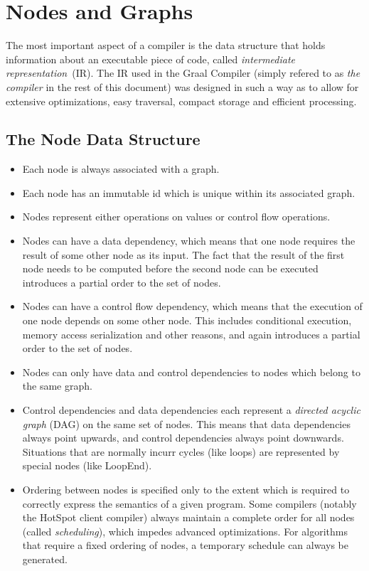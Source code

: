 \section{Nodes and Graphs}
The most important aspect of a compiler is the data structure that holds information about an executable piece of code, called \emph{intermediate representation}~(IR).
The IR used in the Graal Compiler (simply refered to as \emph{the compiler} in the rest of this document) was designed in such a way as to allow for extensive optimizations, easy traversal, compact storage and efficient processing.

\subsection{The Node Data Structure}
\begin{itemize}
    \item Each node is always associated with a graph.
    \item Each node has an immutable id which is unique within its associated graph.
    \item Nodes represent either operations on values or control flow operations.
    \item Nodes can have a data dependency, which means that one node requires the result of some other node as its input. The fact that the result of the first node needs to be computed before the second node can be executed introduces a partial order to the set of nodes.
    \item Nodes can have a control flow dependency, which means that the execution of one node depends on some other node. This includes conditional execution, memory access serialization and other reasons, and again introduces a partial order to the set of nodes.
    \item Nodes can only have data and control dependencies to nodes which belong to the same graph.
    \item Control dependencies and data dependencies each represent a \emph{directed acyclic graph} (DAG) on the same set of nodes. This means that data dependencies always point upwards, and control dependencies always point downwards. Situations that are normally incurr cycles (like loops) are represented by special nodes (like LoopEnd).
    \item Ordering between nodes is specified only to the extent which is required to correctly express the semantics of a given program. Some compilers (notably the HotSpot client compiler) always maintain a complete order for all nodes (called \emph{scheduling}), which impedes advanced optimizations. For algorithms that require a fixed ordering of nodes, a temporary schedule can always be generated.

\end{itemize}
